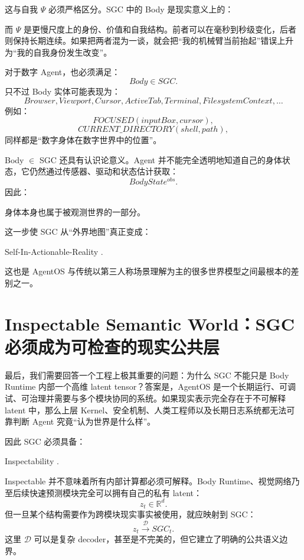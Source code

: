 这与自我 $\Psi$ 必须严格区分。SGC 中的 Body 是现实意义上的：
\begin{statementbox}
\centering
{}
\end{statementbox}
而 $\Psi$ 是更慢尺度上的身份、价值和自我结构。前者可以在毫秒到秒级变化，后者则保持长期连续。如果把两者混为一谈，就会把“我的机械臂当前抬起”错误上升为“我的自我身份发生改变”。

对于数字 Agent，也必须满足：
\[
Body\in SGC.
\]
只不过 Body 实体可能表现为：
\[
Browser,
Viewport,
Cursor,
ActiveTab,
Terminal,
FilesystemContext,
\ldots
\]
例如：
\[
FOCUSED(inputBox,cursor),
\]
\[
CURRENT\_DIRECTORY(shell,path),
\]
同样都是“数字身体在数字世界中的位置”。

Body $\in$ SGC 还具有认识论意义。Agent 并不能完全透明地知道自己的身体状态，它仍然通过传感器、驱动和状态估计获取：
\[
BodyState^{obs}.
\]
因此：
\begin{statementbox}
\centering
{}
\end{statementbox}
身体本身也属于被观测世界的一部分。

这一步使 SGC 从“外界地图”真正变成：
\begin{statementbox}
Self-In-Actionable-Reality .
\end{statementbox}
这也是 AgentOS 与传统以第三人称场景理解为主的很多世界模型之间最根本的差别之一。

\section{Inspectable Semantic World：SGC 必须成为可检查的现实公共层}

最后，我们需要回答一个工程上极其重要的问题：为什么 SGC 不能只是 Body Runtime 内部一个高维 latent tensor？答案是，AgentOS 是一个长期运行、可调试、可治理并需要与多个模块协同的系统。如果现实表示完全存在于不可解释 latent 中，那么上层 Kernel、安全机制、人类工程师以及长期日志系统都无法可靠判断 Agent 究竟“认为世界是什么样”。

因此 SGC 必须具备：
\begin{statementbox}
Inspectability .
\end{statementbox}

Inspectable 并不意味着所有内部计算都必须可解释。Body Runtime、视觉网络乃至后续快速预测模块完全可以拥有自己的私有 latent：
\[
z_t\in\mathbb R^d.
\]
但一旦某个结构需要作为跨模块现实事实被使用，就应映射到 SGC：
\[
z_t
\xrightarrow{\mathcal D}
SGC_t.
\]
这里 $\mathcal D$ 可以是复杂 decoder，甚至是不完美的，但它建立了明确的公共语义边界。

